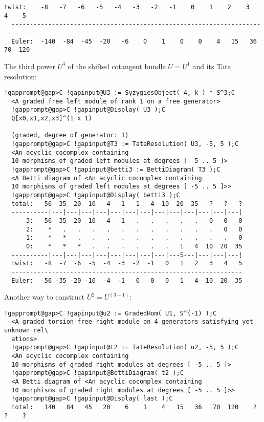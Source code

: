 \documentclass[a4paper,11pt]{report}
\begin{document}
{{{\begin{Verbatim}[commandchars=!@C,fontsize=\small,frame=single,label=Example]
  twist:    -8   -7   -6   -5   -4   -3   -2   -1    0    1    2    3    4    5
  -----------------------------------------------------------------------------
  Euler:  -140  -84  -45  -20   -6    0    1    0    0    4   15   36   70  120
\end{Verbatim}
 The third power $U^3$ of the shifted cotangent bundle $U=U^1$ and its Tate resolution: 
\begin{Verbatim}[commandchars=!@C,fontsize=\small,frame=single,label=Example]
  !gapprompt@gap>C !gapinput@U3 := SyzygiesObject( 4, k ) * S^3;C
  <A graded free left module of rank 1 on a free generator>
  !gapprompt@gap>C !gapinput@Display( U3 );C
  Q[x0,x1,x2,x3]^(1 x 1)
  
  (graded, degree of generator: 1)
  !gapprompt@gap>C !gapinput@T3 := TateResolution( U3, -5, 5 );C
  <An acyclic cocomplex containing
  10 morphisms of graded left modules at degrees [ -5 .. 5 ]>
  !gapprompt@gap>C !gapinput@betti3 := BettiDiagram( T3 );C
  <A Betti diagram of <An acyclic cocomplex containing 
  10 morphisms of graded left modules at degrees [ -5 .. 5 ]>>
  !gapprompt@gap>C !gapinput@Display( betti3 );C
  total:   56  35  20  10   4   1   1   4  10  20  35   ?   ?   ?
  ----------|---|---|---|---|---|---|---|---|---|---|---|---|---|
      3:   56  35  20  10   4   1   .   .   .   .   .   0   0   0
      2:    *   .   .   .   .   .   .   .   .   .   .   .   0   0
      1:    *   *   .   .   .   .   .   .   .   .   .   .   .   0
      0:    *   *   *   .   .   .   .   .   .   1   4  10  20  35
  ----------|---|---|---|---|---|---|---|---|---S---|---|---|---|
  twist:   -8  -7  -6  -5  -4  -3  -2  -1   0   1   2   3   4   5
  ---------------------------------------------------------------
  Euler:  -56 -35 -20 -10  -4  -1   0   0   0   1   4  10  20  35
\end{Verbatim}
 Another way to construct $U^2=U^(3-1)$: 
\begin{Verbatim}[commandchars=!@C,fontsize=\small,frame=single,label=Example]
  !gapprompt@gap>C !gapinput@u2 := GradedHom( U1, S^(-1) );C
  <A graded torsion-free right module on 4 generators satisfying yet unknown rel\
  ations>
  !gapprompt@gap>C !gapinput@t2 := TateResolution( u2, -5, 5 );C
  <An acyclic cocomplex containing
  10 morphisms of graded right modules at degrees [ -5 .. 5 ]>
  !gapprompt@gap>C !gapinput@BettiDiagram( t2 );C
  <A Betti diagram of <An acyclic cocomplex containing 
  10 morphisms of graded right modules at degrees [ -5 .. 5 ]>>
  !gapprompt@gap>C !gapinput@Display( last );C
  total:   140   84   45   20    6    1    4   15   36   70  120    ?    ?    ?

\end{Verbatim}}}}
\end{document}
